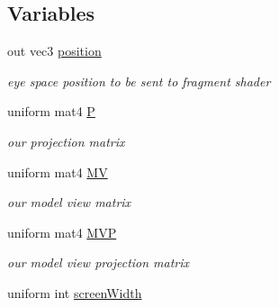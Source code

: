 \subsection*{Variables}
\begin{DoxyCompactItemize}
\item 
\hypertarget{particle_depth_vert_8glsl_af78042b263da1185c97c3202ced45aab}{out vec3 \hyperlink{particle_depth_vert_8glsl_af78042b263da1185c97c3202ced45aab}{position}}\label{particle_depth_vert_8glsl_af78042b263da1185c97c3202ced45aab}

\begin{DoxyCompactList}\small\item\em eye space position to be sent to fragment shader \end{DoxyCompactList}\item 
\hypertarget{particle_depth_vert_8glsl_a06f273d5c491bfbe3897fc9c73dcf0d5}{uniform mat4 \hyperlink{particle_depth_vert_8glsl_a06f273d5c491bfbe3897fc9c73dcf0d5}{P}}\label{particle_depth_vert_8glsl_a06f273d5c491bfbe3897fc9c73dcf0d5}

\begin{DoxyCompactList}\small\item\em our projection matrix \end{DoxyCompactList}\item 
\hypertarget{particle_depth_vert_8glsl_aea165d91373502f69ddf839215635405}{uniform mat4 \hyperlink{particle_depth_vert_8glsl_aea165d91373502f69ddf839215635405}{M\-V}}\label{particle_depth_vert_8glsl_aea165d91373502f69ddf839215635405}

\begin{DoxyCompactList}\small\item\em our model view matrix \end{DoxyCompactList}\item 
\hypertarget{particle_depth_vert_8glsl_ae56d8b04842b99426c8844c0785d3090}{uniform mat4 \hyperlink{particle_depth_vert_8glsl_ae56d8b04842b99426c8844c0785d3090}{M\-V\-P}}\label{particle_depth_vert_8glsl_ae56d8b04842b99426c8844c0785d3090}

\begin{DoxyCompactList}\small\item\em our model view projection matrix \end{DoxyCompactList}\item 
\hypertarget{particle_depth_vert_8glsl_a62a808a061d03e4a62f2d46d3e6efb38}{uniform int \hyperlink{particle_depth_vert_8glsl_a62a808a061d03e4a62f2d46d3e6efb38}{screen\-Width}}\label{particle_depth_vert_8glsl_a62a808a061d03e4a62f2d46d3e6efb38}


\end{DoxyCompactItemize}
